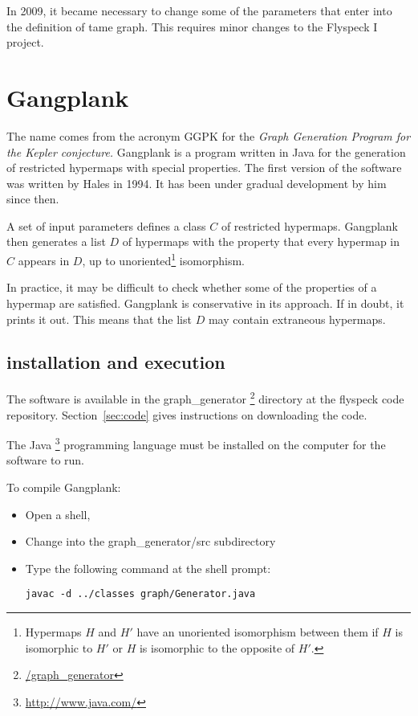 In 2009, it became necessary to change some of the parameters that enter into the definition of tame graph.  This requires minor changes to the Flyspeck I project.



\section{Gangplank}

The name  comes from the acronym GGPK for the {\it
  Graph Generation Program for the Kepler conjecture.}  Gangplank is a
program written in Java for the generation of restricted hypermaps with special properties.
The first version of the software was written by Hales in 1994.  It
has been under gradual development by him since then.

A set of input parameters defines a class $C$ of restricted hypermaps.  Gangplank
then generates a list $D$ of hypermaps with the property that every hypermap in $C$
appears in $D$, up to unoriented\footnote{Hypermaps $H$ and $H'$ have
an unoriented isomorphism between them if $H$ is isomorphic to $H'$ or
$H$ is isomorphic to the opposite of $H'$.} isomorphism.

In practice, it may be difficult to check whether some of the properties of  a hypermap
are satisfied.  Gangplank is conservative in its approach.  If in doubt, it prints it out.
This means that the list $D$ may contain extraneous hypermaps.

\subsection{installation and execution}

The software is available in the graph\_generator%
\footnote {\url{/graph_generator}} %
 directory at the flyspeck code repository.  Section~\ref{sec:code} gives instructions on downloading the code.

The Java%
\footnote{\url{http://www.java.com/}} %
 programming language must be installed on the computer for the software to run.

To compile Gangplank:

\begin{itemize} 
\item Open a shell, 
\item Change into the graph\_generator/src subdirectory
\item Type the following command at the shell prompt:
\begin{verbatim}
javac -d ../classes graph/Generator.java 
\end{verbatim}
\end{itemize}

